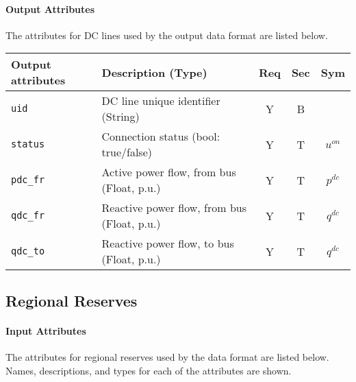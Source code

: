 \documentclass{article}
\begin{document}
\paragraph{Output Attributes}
 The attributes for DC lines 
 used by the output data format are listed below.
\begin{center}
\small
\begin{tabular}{ l | l | c | c | c | }
Output attributes & Description (Type) & Req & Sec & Sym\\
\hline
  {\tt uid}    & DC line unique identifier (String)& Y & B & \\
  {\tt status} & Connection status (bool: true/false) & Y & T & $u^{on}$ \\ 
  {\tt pdc\_fr} & Active power flow, from bus (Float, p.u.)& Y & T & $p^{dc}$ \\
  {\tt qdc\_fr} & Reactive power flow, from bus (Float, p.u.)& Y & T & $q^{dc}$ \\
  {\tt qdc\_to} & Reactive power flow, to bus (Float, p.u.)& Y & T & $q^{dc}$ \\
  \hline
\end{tabular}
\end{center}    

\subsection{Regional Reserves}
\label{nom:reserves}

\paragraph{Input Attributes}
The attributes for regional reserves  
used by the data format are listed below.
Names, descriptions, and types for each of the attributes are shown.
\end{document}
